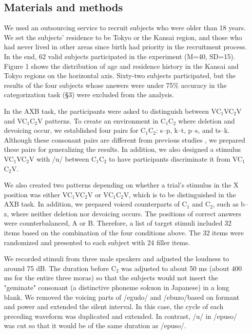 \documentclass[a4paper,11pt,twocolumn]{article}
\begin{document}
\subsection{Materials and methods}

We used an outsourcing service to recruit subjects who were older than 18 years. We set the subjects' residence to be Tokyo or the Kansai region, and those who had never lived in other areas since birth had priority in the recruitment process. In the end, 62 valid subjects participated in the experiment (M=40, SD=15). Figure 1 shows the distribution of age and residence history in the Kansai and Tokyo regions on the horizontal axis. Sixty-two subjects participated, but the results of the four subjects whose answers were under 75\% accuracy in the categorization task (\S3) were excluded from the analysis.

In the AXB task, the participants were asked to distinguish between VC$_\text{1}$VC$_\text{2}$V and VC$_\text{1}$C$_\text{2}$V patterns. To create an environment in C$_\text{1}$C$_\text{2}$ where deletion and devoicing occur, we established four pairs for C$_\text{1}$C$_\text{2}$: s--p, k--t, p--s, and ts--k. Although these consonant pairs are different from previous studies \cite{kilpatrick2018japanese}, we prepared these pairs for generalizing the results. In addition, we also designed a stimulus VC$_\text{1}$VC$_\text{2}$V with /u/ between C$_\text{1}$C$_\text{2}$ to have participants discriminate it from VC$_\text{1}$C$_\text{2}$V.

We also created two patterns depending on whether a trial's stimulus in the X position was either VC$_\text{1}$VC$_\text{2}$V or VC$_\text{1}$C$_\text{2}$V, which is to be distinguished in the AXB task. In addition, we prepared voiced counterparts of C$_\text{1}$ and C$_\text{2}$, such as b--z, where neither deletion nor devoicing occurs. The positions of correct answers were counterbalanced, A or B. Therefore, a list of target stimuli included 32 items based on the combination of the four conditions above. The 32 items were randomized and presented to each subject with 24 filler items.

We recorded stimuli from three male speakers and adjusted the loudness to around 75 dB. The duration before C$_\text{2}$ was adjusted to about 50 ms (about 400 ms for the entire three moras) so that the subjects would not insert the "geminate" consonant (a distinctive phoneme sokuon in Japanese) in a long blank. We removed the voicing parts of /egudo/ and /ebuzo/based on formant and power and extended the silent interval. In this case, the cycle of each preceding waveform was duplicated and extended. In contrast, /u/ in /epuso/ was cut so that it would be of the same duration as /epuso/.
\end{document}
